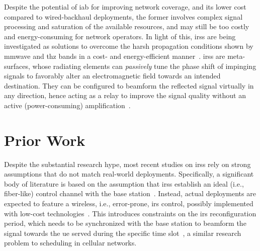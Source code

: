 
Despite the potential of \gls{iab} for improving network coverage, and its lower cost compared to wired-backhaul deployments, the former involves complex signal processing and saturation of the available resources, and may still be too costly and energy-consuming for network operators.
In light of this, \glspl{irs} are being investigated as solutions to overcome the harsh propagation conditions shown by \gls{mmwave} and \gls{thz} bands in a cost- and energy-efficient manner~\cite{flamini2022towards}. 
\glspl{irs} are meta-surfaces, whose radiating elements can \emph{passively} tune the phase shift of impinging signals to favorably alter an electromagnetic field towards an intended destination. They can be configured to beamform the reflected signal virtually in any direction, hence acting as a relay to improve the signal quality without an active (power-consuming) amplification~\cite{bjornson2019intelligent}. 

\section{Prior Work}
Despite the substantial research hype, most recent studies on \glspl{irs} rely on strong assumptions that do not match real-world deployments.
Specifically, a significant body of literature is based on the assumption that \glspl{irs} establish an ideal (i.e., fiber-like) control channel with the base station~\cite{wu2020towards, abeywickrama2020intelligent, wu2019intelligent, pagin2022end}. Instead, actual deployments are expected to feature a wireless, i.e., error-prone, \gls{irs} control, possibly implemented with low-cost technologies~\cite{liu2022path, liaskos2018realizing}. 
This introduces constraints on the \gls{irs} reconfiguration period, which needs to be synchronized with the base station to beamform the signal towards the \gls{ue} served during the specific time slot~\cite{flamini2022towards}, a similar research problem to scheduling in cellular networks. 

